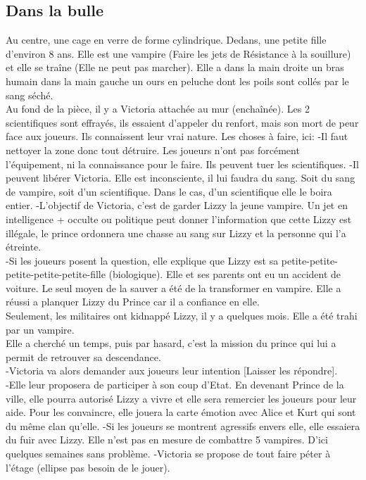 \documentclass[oneside,12pt]{book}
\begin{document}
\begin{flushleft}
\section{Dans la bulle}
Au centre, une cage en verre de forme cylindrique. Dedans, une petite fille d'environ 8 ans.
Elle est une vampire (Faire les jets de Résistance à la souillure) et elle se traîne (Elle ne peut pas marcher). Elle a dans la main droite un bras humain dans la main gauche un ours en peluche dont les poils sont collés par le sang séché.\\
\vspace{0.5cm}
Au fond de la pièce, il y a Victoria attachée au mur (enchaînée). Les 2 scientifiques sont effrayés, ils essaient d'appeler du renfort, mais son mort de peur face aux joueurs. Ils connaissent leur vrai nature.
\vspace{0.5cm}
Les choses à faire, ici:
-Il faut nettoyer la zone donc tout détruire. Les joueurs n'ont pas forcément l'équipement, ni la connaissance pour le faire. Ils peuvent tuer les scientifiques.
-Il peuvent libérer Victoria. Elle est inconsciente, il lui faudra du sang. Soit du sang de vampire, soit d'un scientifique. Dans le cas, d'un scientifique elle le boira entier.
-L'objectif de Victoria, c'est de garder Lizzy la jeune vampire.
Un jet en intelligence + occulte ou politique peut donner l'information que cette Lizzy est illégale, le prince ordonnera une chasse au sang sur Lizzy et la personne qui l'a étreinte.\\
-Si les joueurs posent la question, elle explique que Lizzy est sa petite-petite-petite-petite-petite-fille (biologique). 
Elle et ses parents ont eu un accident de voiture. Le seul moyen de la sauver a été de la transformer en vampire. Elle a réussi a planquer Lizzy du Prince car il a confiance en elle. \\
\vspace{0.5cm}
Seulement, les militaires ont kidnappé Lizzy, il y a quelques mois. Elle a été trahi par un vampire. \\
\vspace{0.5cm}
Elle a cherché un temps, puis par hasard, c'est la mission du prince qui lui a permit de retrouver sa descendance.\\
\vspace{0.5cm}
-Victoria va alors demander aux joueurs leur intention [Laisser les répondre].\\
-Elle leur proposera de participer à son coup d'Etat. En devenant Prince de la ville, elle pourra autorisé Lizzy a vivre et elle sera remercier les joueurs pour leur aide. Pour les convaincre, elle jouera la carte émotion avec Alice et Kurt qui sont du même clan qu'elle.
-Si les joueurs se montrent agressifs envers elle, elle essaiera du fuir avec Lizzy. Elle n'est pas en mesure de combattre 5 vampires. D'ici quelques semaines sans problème.
-Victoria se propose de tout faire péter à l'étage (ellipse pas besoin de le jouer).


\end{flushleft}
\end{document}
